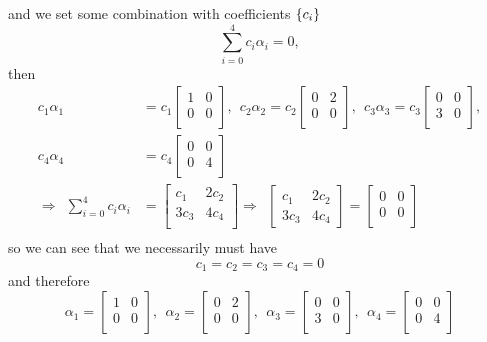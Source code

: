 and we set some combination with coefficients $\{c_{i}\}$
$$
\sum_{i=0}^{4}c_{i}\alpha_{i} = 0,
$$
then
$$
\begin{aligned}
c_{1}\alpha_{1} &= c_{1}\begin{bmatrix}
    1 & 0 \\
    0 & 0 \\
    \end{bmatrix}, \:\:
c_{2}\alpha_{2} = c_{2}\begin{bmatrix}
    0 & 2 \\
    0 & 0 \\
    \end{bmatrix}, \:\:
c_{3}\alpha_{3} = c_{3}\begin{bmatrix}
    0 & 0 \\
    3 & 0 \\
    \end{bmatrix}, \\
c_{4}\alpha_{4} &= c_{4}\begin{bmatrix}
    0 & 0 \\
    0 & 4 \\
    \end{bmatrix} \\
\Rightarrow \:\: \sum_{i=0}^{4}c_{i}\alpha_{i}&= \begin{bmatrix}
c_{1} & 2c_{2} \\
3c_{3} & 4c_{4} \\
\end{bmatrix} 
\Rightarrow \:\: \begin{bmatrix}
c_{1} & 2c_{2} \\
3c_{3} & 4c_{4} 
\end{bmatrix} =
\begin{bmatrix}
0 & 0 \\
0 & 0 \\
\end{bmatrix}\\
\end{aligned} 
$$
so we can see that we necessarily must have
$$
c_{1}=c_{2}=c_{3}=c_{4}=0
$$
and therefore 
$$
\alpha_{1} = \begin{bmatrix}
    1 & 0 \\
    0 & 0 \\
    \end{bmatrix}, \:\:
\alpha_{2} = \begin{bmatrix}
    0 & 2 \\
    0 & 0 \\
    \end{bmatrix}, \:\:
\alpha_{3} = \begin{bmatrix}
    0 & 0 \\
    3 & 0 \\
    \end{bmatrix}, \:\:
\alpha_{4} = \begin{bmatrix}
    0 & 0 \\
    0 & 4 \\
    \end{bmatrix}
$$
